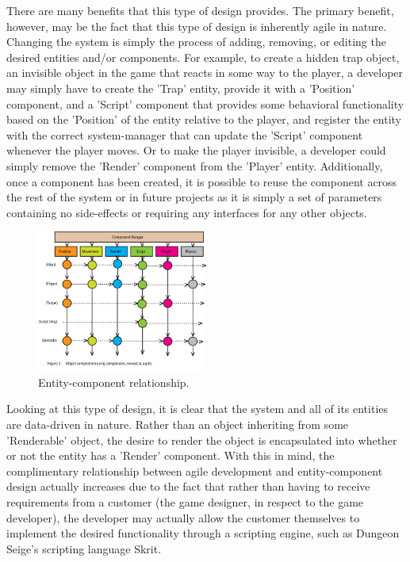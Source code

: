 There are many benefits that this type of design provides. The primary benefit, however, may be the fact that this type of design is inherently agile in nature. Changing the system is simply the process of adding, removing, or editing the desired entities and/or components. For example, to create a hidden trap object, an invisible object in the game that reacts in some way to the player, a developer may simply have to create the 'Trap' entity, provide it with a 'Position' component, and a 'Script' component that provides some behavioral functionality based on the 'Position' of the entity relative to the player, and register the entity with the correct system-manager that can update the 'Script' component whenever the player moves. Or to make the player invisible, a developer could simply remove the 'Render' component from the 'Player' entity. Additionally, once a component has been created, it is possible to reuse the component across the rest of the system or in future projects as it is simply a set of parameters containing no side-effects or requiring any interfaces for any other objects.

\begin{figure}[h!]
  \centering \includegraphics[width=0.5\textwidth]{Images/aggregation.png}
  \caption{Entity-component relationship.\cite{evolve_your_hierarchy}}
\end{figure}

Looking at this type of design, it is clear that the system and all of its entities are data-driven in nature. Rather than an object inheriting from some 'Renderable' object, the desire to render the object is encapsulated into whether or not the entity has a 'Render' component. With this in mind, the complimentary relationship between agile development and entity-component design actually increases due to the fact that rather than having to receive requirements from a customer (the game designer, in respect to the game developer), the developer may actually allow the customer themselves to implement the desired functionality through a scripting engine, such as Dungeon Seige's scripting language Skrit.

